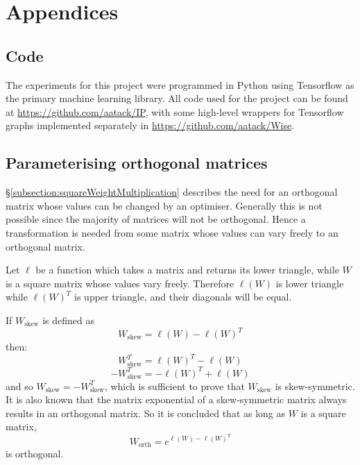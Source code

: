 \documentclass[../main.tex]{subfiles}
\begin{document}
\chapter*{Appendices} \label{chapter:appendices}

\renewcommand{\thesection}{\Alph{section}}
\setcounter{section}{0}
\renewcommand*{\theHsection}{chX.\the\value{section}}

\section{Code} \label{appendix:code}

The experiments for this project were programmed in Python using Tensorflow as the primary machine learning library.
All code used for the project can be found at \url{https://github.com/aatack/IP}, with some high-level wrappers for Tensorflow graphs implemented separately in \url{https://github.com/aatack/Wise}.

\section{Parameterising orthogonal matrices} \label{appendix:parameterisingOrthogonalMatrices}

\S\ref{subsection:squareWeightMultiplication} describes the need for an orthogonal matrix whose values can be changed by an optimiser.
Generally this is not possible since the majority of matrices will not be orthogonal.
Hence a transformation is needed from some matrix whose values can vary freely to an orthogonal matrix.

Let $\ell$ be a function which takes a matrix and returns its lower triangle, while $W$ is a square matrix whose values vary freely.
Therefore $\ell(W)$ is lower triangle while $\ell(W)^T$ is upper triangle, and their diagonals will be equal.

If $W_\text{skew}$ is defined as
\begin{equation}
    W_\text{skew}=\ell(W)-\ell(W)^T
\end{equation}
then:
\begin{equation}
    W_\text{skew}^T=\ell(W)^T-\ell(W)
\end{equation}
\begin{equation}
    -W_\text{skew}^T=-\ell(W)^T+\ell(W)
\end{equation}
and so $W_\text{skew}=-W_\text{skew}^T$, which is sufficient to prove that $W_\text{skew}$ is skew-symmetric.
It is also known that the matrix exponential of a skew-symmetric matrix always results in an orthogonal matrix.
So it is concluded that as long as $W$ is a square matrix,
\begin{equation}
    W_\text{orth}=e^{\ell(W)-\ell(W)^T}
\end{equation}
is orthogonal.
\end{document}
